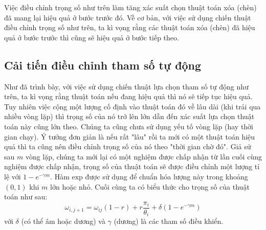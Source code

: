 Việc điều chỉnh trọng số như trên làm tăng xác suất chọn thuật toán xóa (chèn) đã mang lại hiệu quả ở bước trước đó. Về cơ bản, với việc sử dụng chiến thuật điều chỉnh trọng số như trên, ta kì vọng rằng các thuật toán xóa (chèn) đã hiệu quả ở bước trước thì cũng sẽ hiệu quả ở bước tiếp theo. 

\subsection{Cải tiến điều chỉnh tham số tự động}
Như đã trình bày, với việc sử dụng chiến thuật lựa chọn tham số tự động như trên, ta kì vọng rằng thuật toán nếu đang hiệu quả thì nó sẽ tiếp tục hiệu quả. Tuy nhiên việc cộng một lượng cố định vào thuật toán đó về lâu dài (khi trải qua nhiều vòng lặp) thì trọng số của nó trở lên lớn dẫn đến xác suất lựa chọn thuật toán này cũng lớn theo. Chúng ta cũng chưa sử dụng yếu tố vòng lặp (hay thời gian chạy). Ý tưởng đơn giản là nếu rất "lâu" rồi ta mới có một thuật toán hiệu quả thì ta cũng nên điều chỉnh trọng số của nó theo "thời gian chờ đó". Giả sử sau $m$ vòng lặp, chúng ta mới lại có một nghiệm được chấp nhận từ lần cuối cùng nghiệm được chấp nhận, trọng số của thuật toán sẽ được điều chỉnh một lượng tỉ lệ với $1 - e^{-\gamma m}$. Hàm $\text{exp}$ được sử dụng để chuẩn hóa lượng này trong khoảng $(0,1)$ khi $m$ lớn hoặc nhỏ. Cuối cùng ta có biểu thức cho trọng số của thuật toán như sau:
\begin{equation}
  \label{eq:boost_adaptive_weight}
  \omega_{i, j+1} = \omega_{ij}(1-r)+r\frac{\pi_i} {\theta_i} + \delta (1 - e^{-\gamma m})
\end{equation}
với $\delta$ (có thể âm hoặc dương) và $\gamma$ (dương) là các tham số điều khiển. 
